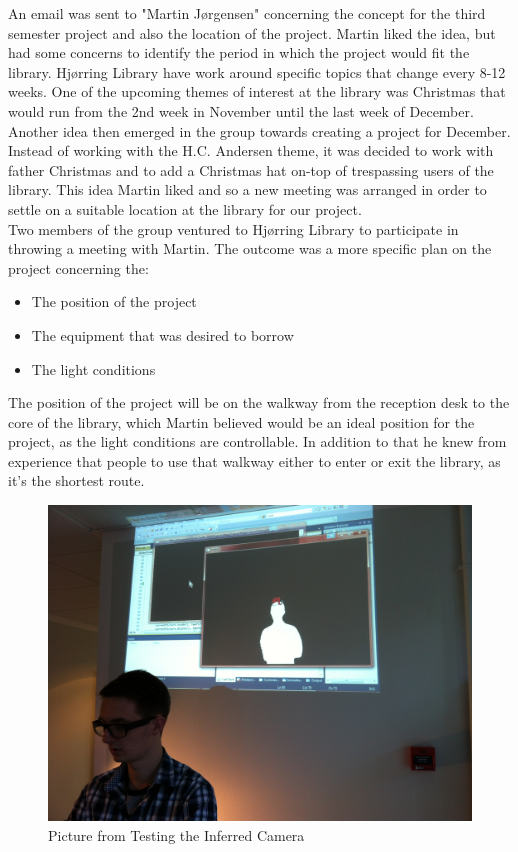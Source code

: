 An email was sent to "Martin Jørgensen" concerning the concept for the third semester project and also the location of the project. Martin liked the idea, but had some concerns to identify the period in which the project would fit the library. Hjørring Library have work around specific topics that change every 8-12 weeks. One of the upcoming themes of interest at the library was Christmas that would run from the 2nd week in November until the last week of December. Another idea then emerged in the group towards creating a project for December. Instead of working with the H.C. Andersen theme, it was decided to work with father Christmas and to add a Christmas hat on-top of trespassing users of the library. This idea Martin liked and so a new meeting was arranged in order to settle on a suitable location at the library for our project.\\
Two members of the group ventured to Hjørring Library to participate in throwing a meeting with Martin. The outcome was a more specific plan on the project concerning the:
\begin{itemize}
\item The position of the project
\item The equipment that was desired to borrow
\item The light conditions
\end{itemize}
The position of the project will be on the walkway from the reception desk to the core of the library, which Martin believed would be an ideal position for the project, as the light conditions are controllable. In addition to that he knew from experience that people to use that walkway either to enter or exit the library, as it's the shortest route.
\begin{figure}[htbp]
\centering
\includegraphics[width=1.00\textwidth]{Pictures/Test/IMG_1477.jpg}
\caption{Picture from Testing the Inferred Camera}
\label{fig:Picture from Testing the Inferred Camera}
\end{figure}



